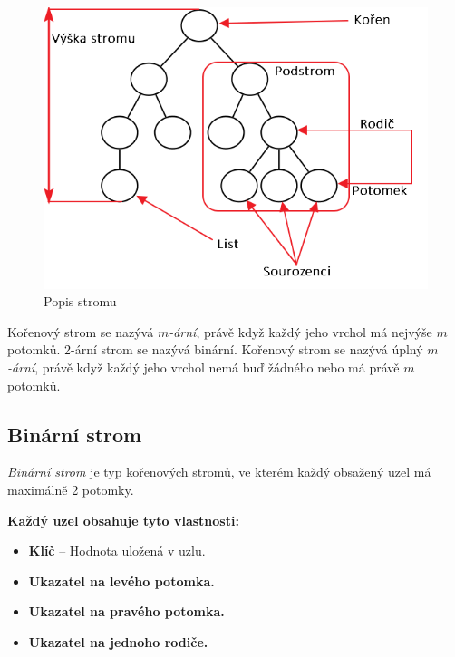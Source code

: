 \documentclass[
  biblatex=false,
  font=serif,
  glossaries=false,
  tables=false,
  theorems=false,
  index
]{kidiplom}
\begin{document}
\begin{figure}[h!]
\centering
	\includegraphics[scale=0.6]{obrazky/2PopisStromu.png}
	\caption{Popis stromu}
\end{figure}

\begin{definition}
Kořenový strom se nazývá $m$\textit{-ární}, právě když každý jeho vrchol má nejvýše $m$ potomků. 2-ární strom se nazývá binární. Kořenový strom se nazývá úplný $m$\textit{-ární}, právě když každý jeho vrchol nemá buď žádného nebo má právě $m$ potomků.\cite{belohlavekVychodil}
\end{definition}
\smallskip

\subsection{Binární strom}
\begin{definition}
\textit{Binární strom} je typ kořenových stromů, ve kterém každý obsažený uzel má maximálně 2 potomky.
\end{definition}
\smallskip

\noindent\textbf{Každý uzel obsahuje tyto vlastnosti:}
\begin{itemize}
\item \textbf{Klíč} -- Hodnota uložená v uzlu.
\item \textbf{Ukazatel na levého potomka.}
\item \textbf{Ukazatel na pravého potomka.}
\item \textbf{Ukazatel na jednoho rodiče.}
\end{itemize}
\end{document}

